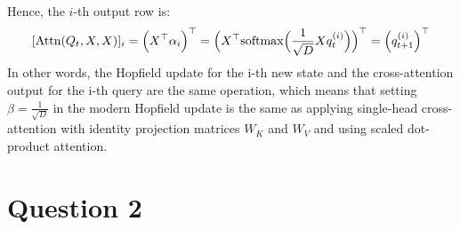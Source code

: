 \documentclass[12pt,a4paper]{article}
\begin{document}
        Hence, the \(i\)-th output row is:
        \[
            [\text{Attn}(Q_t, X, X)]_i = \Bigl( X^\top \alpha_i \Bigr)^\top
            = \Bigl( X^\top \mathrm{softmax} \Bigl( \frac{1}{\sqrt{D}} X q_t^{(i)} \Bigr) \Bigr)^\top
            = \Bigl( q_{t+1}^{(i)} \Bigr)^\top
        \]
        In other words, the Hopfield update for the i-th new state and the cross-attention output for the i-th query are the same operation, which means that setting \(\beta = \frac{1}{\sqrt{D}}\) in the modern Hopfield update is the same as applying single-head cross-attention with identity projection matrices \(W_K\) and \(W_V\) and using scaled dot-product attention.

    \section{Question 2}
\end{document}

